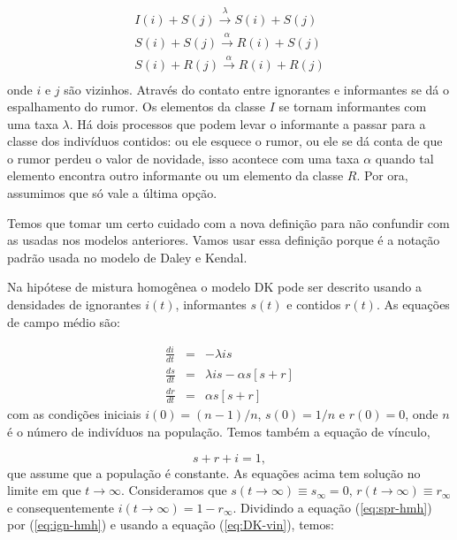 \documentclass[a4paper,11pt]{report}
\begin{document}
\begin{eqnarray}
I(i)+S(j)\stackrel{\lambda}{\longrightarrow} S(i)+S(j)\\
S(i)+S(j)\stackrel{\alpha}{\longrightarrow} R(i)+S(j)\\
S(i)+R(j)\stackrel{\alpha}{\longrightarrow} R(i)+R(j)\\
\end{eqnarray}
onde $i$ e $j$ s\~ao vizinhos. Atrav\'es do contato entre ignorantes e informantes se d\'a o espalhamento do rumor. Os elementos da classe $I$ se tornam informantes com uma taxa $\lambda$. H\'a dois processos que podem levar o informante a passar para a classe dos indiv\'iduos contidos: ou ele esquece o rumor, ou ele se d\'a conta de que o rumor perdeu o valor de novidade, isso acontece com uma taxa $\alpha$ quando tal elemento encontra outro informante ou um elemento da classe $R$. Por ora, assumimos que s\'o vale a \'ultima op\c{c}\~ao.

Temos que tomar um certo cuidado com a nova defini\c{c}\~ao para n\~ao confundir com as usadas nos modelos anteriores. Vamos usar essa defini\c{c}\~ao porque \'e a nota\c{c}\~ao padr\~ao usada no modelo de Daley e Kendal.

Na hip\'otese de mistura homog\^enea o modelo DK pode ser descrito usando a densidades de ignorantes $i(t)$, informantes $s(t)$ e contidos $r(t)$. As equa\c{c}\~oes de campo m\'edio s\~ao:

\begin{eqnarray}
\frac{di}{dt}&=&-\lambda i s \label{eq:ign-hmh}\\
\frac{ds}{dt}&=&\lambda i s -\alpha s[s+r]\label{eq:spr-hmh} \\
\frac{dr}{dt}&=&\alpha s[s+r] \label{eq:sti-hmh}
\end{eqnarray}
com as condi\c{c}\~oes iniciais $i(0)=(n-1)/n$, $s(0)=1/n$ e $r(0)=0$, onde $n$	\'e o n\'umero de indiv\'iduos na popula\c{c}\~ao. Temos tamb\'em a equa\c{c}\~ao de v\'inculo, 

\begin{equation}
s+r+i=1,
\label{eq:DK-vin}
\end{equation}
que assume que a popula\c{c}\~ao \'e constante. As equa\c{c}\~oes acima tem solu\c{c}\~ao no limite em que $t\to \infty$. Consideramos que $s(t\to \infty)\equiv s_{\infty}=0$, $r(t \to \infty)\equiv r_{\infty}$ e consequentemente $i(t\to \infty)=1-r_{\infty}$. Dividindo a equa\c{c}\~ao (\ref{eq:spr-hmh}) por (\ref{eq:ign-hmh}) e usando a equa\c{c}\~ao (\ref{eq:DK-vin}), temos:
\end{document}
